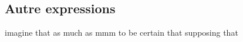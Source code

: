 \subsection*{Autre expressions}

   {imagine that}
   {as much as}
   {mmm}
   {to be certain that}
   {supposing that}
